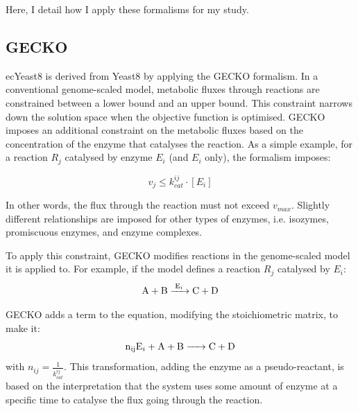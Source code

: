 Here, I detail how I apply these formalisms for my study.

\subsection{GECKO}
\label{subsec:model-yeast8-gecko}

ecYeast8 is derived from Yeast8 by applying the GECKO formalism.
In a conventional genome-scaled model, metabolic fluxes through reactions are constrained between a lower bound and an upper bound.
This constraint narrows down the solution space when the objective function is optimised.
GECKO imposes an additional constraint on the metabolic fluxes based on the concentration of the enzyme that catalyses the reaction.
As a simple example, for a reaction $R_{j}$ catalysed by enzyme $E_{i}$ (and $E_{i}$ only), the formalism imposes:

\begin{equation}
  v_{j} \le k_{cat}^{ij} \cdot [E_{i}]
\end{equation}

In other words, the flux through the reaction must not exceed $v_{max}$.
Slightly different relationships are imposed for other types of enzymes, i.e. isozymes, promiscuous enzymes, and enzyme complexes.

To apply this constraint, GECKO modifies reactions in the genome-scaled model it is applied to.
For example, if the model defines a reaction $R_{j}$ catalysed by $E_{i}$:
\begin{equation}
  \ce{ A + B ->[E_{i}] C + D }
\end{equation}

GECKO adds a term to the equation, modifying the stoichiometric matrix, to make it:
\begin{equation}
  \ce{ n_{ij}E_{i} + A + B -> C + D }
\end{equation}
with $n_{ij} = \frac{1}{k_{cat}^{ij}}$.
This transformation, adding the enzyme as a pseudo-reactant, is based on the interpretation that the system uses some amount of enzyme at a specific time to catalyse the flux going through the reaction.


